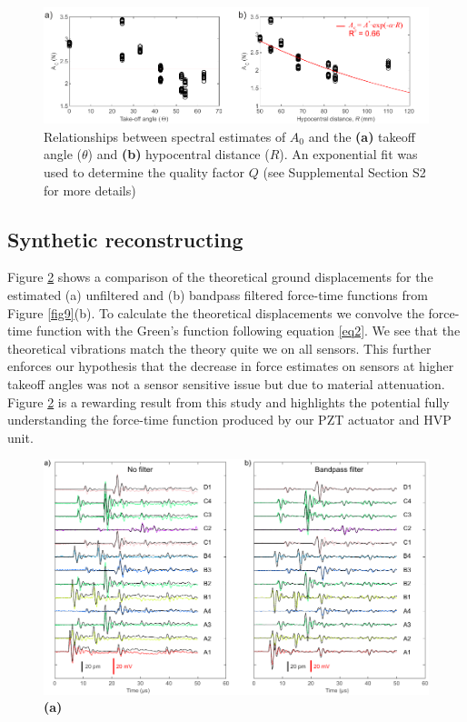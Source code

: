 \documentclass[preprint,3p, 11pt,authoryear]{elsarticle}
\begin{document}
{\begin{figure}[ht]
     	\centering
\includegraphics[scale= 1]{FIG9a.pdf} 
\caption{Relationships between spectral estimates of $A_{0}$ and the \textbf{(a)} takeoff angle ($\theta$) and \textbf{(b)} hypocentral distance ($R$). An exponential fit was used to determine the quality factor $Q$ (see Supplemental Section S2 for more details)  }
	\label{fig9a} 
\end{figure}
\subsection{Synthetic reconstructing}
Figure \ref{fig10} shows a comparison of the theoretical ground displacements for the estimated (a) unfiltered and (b) bandpass filtered force-time functions from Figure \ref{fig9}(b).  To calculate the theoretical displacements we convolve the force-time function with the Green's function following equation \eqref{eq2}. We see that the theoretical vibrations match the theory quite we on all sensors. This further enforces our hypothesis that the decrease in force estimates on sensors at higher takeoff angles was not a sensor sensitive issue but due to material attenuation. Figure \ref{fig10} is a rewarding result from this study and highlights the potential fully understanding the force-time function produced by our PZT actuator and HVP unit.  

\begin{figure}[ht]
     	\centering
\includegraphics[scale= 1]{FIG10.pdf} 
\caption{\textbf{(a)}  }
	\label{fig10} 
\end{figure}

}
\end{document}
